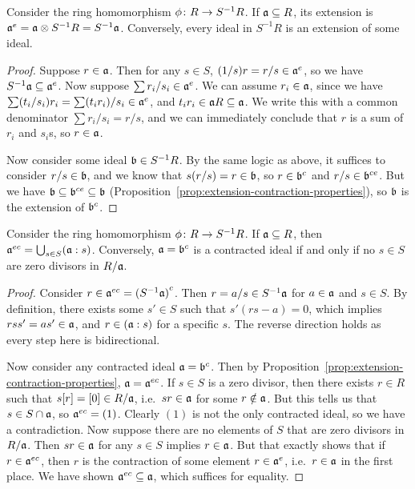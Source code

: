 \begin{lemma}\label{lem:fraction-extensions}
    Consider the ring homomorphism \(\phi\colon R\to S^{-1}R\).
    If \(\mathfrak{a} \subseteq R\), its extension is \(\mathfrak{a}^e = \mathfrak{a} \otimes S^{-1}R = S^{-1}\mathfrak{a}\).
    Conversely, every ideal in \(S^{-1}R\) is an extension of some ideal.
\end{lemma}
\begin{proof}
    Suppose \(r \in \mathfrak{a}\).
    Then for any \(s \in S\), \((1/s)r = r/s \in \mathfrak{a}^e\),
    so we have \(S^{-1}\mathfrak{a} \subseteq \mathfrak{a}^e\).
    Now suppose \(\sum r_i/s_i \in \mathfrak{a}^e\).
    We can assume \(r_i \in \mathfrak{a}\),
    since we have \(\sum (t_i/s_i)r_i = \sum (t_i r_i)/s_i \in \mathfrak{a}^e\),
    and \(t_i r_i \in \mathfrak{a}R \subseteq \mathfrak{a}\).
    We write this with a common denominator \(\sum r_i/s_i = r/s\),
    and we can immediately conclude that \(r\) is a sum of \(r_i\) and \(s_i\)s,
    so \(r \in \mathfrak{a}\).

    Now consider some ideal \(\mathfrak{b} \in S^{-1}R\).
    By the same logic as above, it suffices to consider \(r/s \in \mathfrak{b}\),
    and we know that \(s(r/s) = r \in \mathfrak{b}\),
    so \(r \in \mathfrak{b}^c\) and \(r/s \in \mathfrak{b}^{ce}\).
    But we have \(\mathfrak{b} \subseteq \mathfrak{b}^{ce} \subseteq \mathfrak{b}\)
    (Proposition~\ref{prop:extension-contraction-properties}),
    so \(\mathfrak{b}\) is the extension of \(\mathfrak{b}^c\).
\end{proof}
\begin{lemma}\label{lem:fraction-contractions}
    Consider the ring homomorphism \(\phi\colon R\to S^{-1}R\).
    If \(\mathfrak{a} \subseteq R\),
    then \(\mathfrak{a}^{ec} = \bigcup_{s \in S} (\mathfrak{a}:s)\).
    Conversely, \(\mathfrak{a} = \mathfrak{b}^c\) is a contracted ideal
    if and only if no \(s \in S\) are zero divisors in \(R/\mathfrak{a}\).
\end{lemma}
\begin{proof}
    Consider \(r \in \mathfrak{a}^{ec} = {(S^{-1}\mathfrak{a})}^c\).
    Then \(r = a/s \in S^{-1}\mathfrak{a}\) for \(a \in \mathfrak{a}\) and \(s \in S\).
    By definition, there exists some \(s' \in S\) such that \(s'(rs-a) = 0\),
    which implies \(rss' = as' \in \mathfrak{a}\),
    and \(r \in (\mathfrak{a}:s)\) for a specific \(s\).
    The reverse direction holds as every step here is bidirectional.

    Now consider any contracted ideal \(\mathfrak{a} = \mathfrak{b}^c\).
    Then by Proposition~\ref{prop:extension-contraction-properties}, \(\mathfrak{a} = \mathfrak{a}^{ec}\).
    If \(s \in S\) is a zero divisor,
    then there exists \(r \in R\) such that \(s[r] = [0] \in R/\mathfrak{a}\),
    i.e.\ \(sr \in \mathfrak{a}\) for some \(r \notin \mathfrak{a}\).
    But this tells us that \(s \in S \cap \mathfrak{a}\),
    so \(\mathfrak{a}^{ec} = (1)\).
    Clearly \((1)\) is not the only contracted ideal,
    so we have a contradiction.
    Now suppose there are no elements of \(S\) that are zero divisors in \(R/\mathfrak{a}\).
    Then \(sr \in \mathfrak{a}\) for any \(s \in S\) implies \(r \in \mathfrak{a}\).
    But that exactly shows that if \(r \in \mathfrak{a}^{ec}\),
    then \(r\) is the contraction of some element \(r \in \mathfrak{a}^e\),
    i.e.\ \(r \in \mathfrak{a}\) in the first place.
    We have shown \(\mathfrak{a}^{ec} \subseteq \mathfrak{a}\),
    which suffices for equality.
\end{proof}
